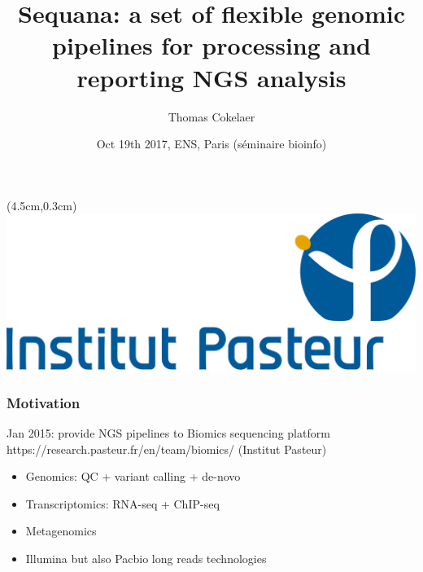 \documentclass{beamer}
\title[Sequana]{Sequana: a set of flexible genomic pipelines for processing 
and reporting NGS analysis}
\author[T. Cokelaer]{Thomas Cokelaer}
\institute{Institut Pasteur}
\date{Oct 19th 2017, ENS, Paris (séminaire bioinfo)}
\begin{document}

\begin{frame}[plain]
    \titlepage
    \begin{textblock*}{5cm}(4.5cm,0.3cm)
        \includegraphics[scale=0.09]{images/Institut_Pasteur.png}
    \end{textblock*}
\end{frame}



%
%
%



\begin{frame}
\frametitle{Motivation}
\begin{block}{Jan 2015: provide NGS pipelines to Biomics sequencing platform 
https://research.pasteur.fr/en/team/biomics/ (Institut Pasteur)}
 \begin{itemize}
  \item Genomics: QC + variant calling + de-novo
  \item Transcriptomics: RNA-seq + ChIP-seq 
  \item Metagenomics
  \item Illumina but also Pacbio long reads technologies
 \end{itemize}
\end{block} 
\end{frame}
\end{document}
